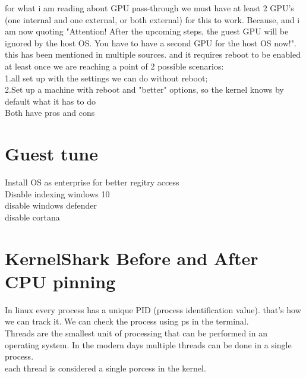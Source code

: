 \documentclass[11pt, a4paper, oneside]{article}
\theoremstyle{definition}
\begin{document}
for what i am reading about GPU pass-through we must have at least 2 GPU's (one internal and one external, or both external) for this to work. Because, and i am now quoting "Attention! After the upcoming steps, the guest GPU will be ignored by the host OS. You have to have a second GPU for the host OS now!".\\
this has been mentioned in multiple sources. and it requires reboot to be enabled at least once
we are reaching a point of 2 possible scenarios:  \\
1.all set up with the settings we can do without reboot;\\
2.Set up a machine with reboot and "better" options, so the kernel knows by default what it has to do\\
Both have pros and cons\\

\vfill
\pagebreak
\section{Guest tune}
Install OS as enterprise for better regitry access\\
Disable indexing windows 10\\
disable windows defender\\
disable cortana\\

\vfill
\pagebreak
\section{KernelShark Before and After CPU pinning}

In linux every process has a unique PID (process identification value). that's how we can track it.
We can check the process using ps in the terminal.\\
Threads are the smallest unit of processing that can be performed in an operating system. In the modern days multiple threads can be done in a single process.\\
each thread is considered a single porcess in the kernel.\\



\vfill
\pagebreak
\end{document}
